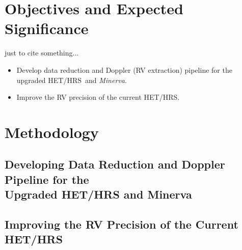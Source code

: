 \documentclass[12pt]{article}
\def\minerva{{\it Minerva}}
\def\hrs{HET/HRS}
\begin{document}

\section{Objectives and Expected Significance}

just to cite \cite{tuomi2013} something...

\begin{itemize}[leftmargin=2.2em]
    \vspace{-3pt}
\item Develop data reduction and Doppler (RV extraction) pipeline
  for the upgraded \hrs\ and \minerva.
    \vspace{-3pt}
\end{itemize}


\begin{itemize}[leftmargin=2.2em]
  \vspace{-3pt}
\item Improve the RV precision of the current \hrs.
  \vspace{-3pt}
\end{itemize}




\vspace{-3pt}
\section{Methodology}


\vspace{-3pt}
\subsection{Developing Data Reduction and Doppler Pipeline for the \\
  Upgraded HET/HRS and Minerva}\label{develop} 

\vspace{-3pt}
\subsection{Improving the RV Precision of the Current HET/HRS}
\end{document}
